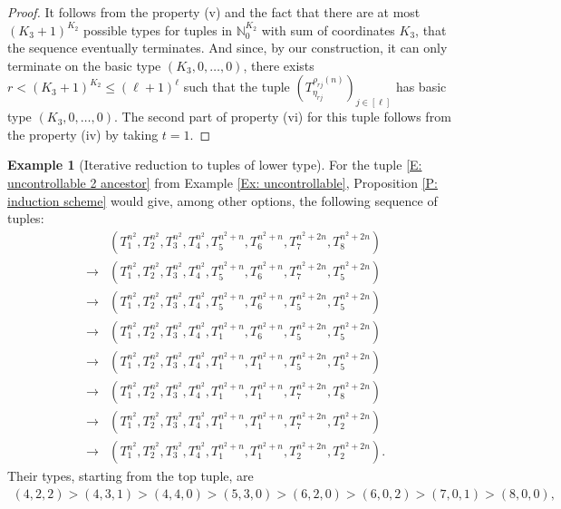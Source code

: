 \documentclass[11pt]{amsart}
\theoremstyle{definition}
\newtheorem{example}{Example}
\newcommand{\N}{{\mathbb N}}
\newcommand{\brac}[1]{\mathopen{}\left( #1 \mathclose{}\right)}
\begin{document}
\begin{proof}
It follows from the property (v) and the fact that there are at most $(K_3+1)^{K_2}$ possible types for tuples in $\N_0^{K_2}$ with sum of coordinates  $K_3$, that the sequence eventually terminates. And since, by our construction, it can only terminate on the basic type
	$(K_3,0,\ldots, 0)$,
there exists $r<(K_3+1)^{K_2}\leq (\ell+1)^\ell$ such that the tuple $\brac{T_{\eta_{rj}}^{\rho_{rj}(n)}}_{j\in[\ell]}$ has basic type $(K_3,0,\ldots, 0)$. The second part of property (vi) for this tuple follows from the property (iv) by taking $t=1$.
\end{proof}

\begin{example}[Iterative reduction to tuples of lower type]\label{Ex: induction scheme ex}
For the tuple \eqref{E: uncontrollable 2 ancestor} from Example \ref{Ex: uncontrollable}, Proposition \ref{P: induction scheme} would give, among other options, the following sequence of tuples:
\begin{align*}
        &\brac{T_1^{n^2}, T_2^{n^2}, T_3^{n^2}, T_4^{n^2}, T_5^{n^2+n}, T_6^{n^2+n}, T_7^{n^2+2n}, T_8^{n^2+2n}}\\
        \rightarrow & \brac{T_1^{n^2}, T_2^{n^2}, T_3^{n^2}, T_4^{n^2}, T_5^{n^2+n}, T_6^{n^2+n}, T_7^{n^2+2n}, T_5^{n^2+2n}}\\
        \rightarrow & \brac{T_1^{n^2}, T_2^{n^2}, T_3^{n^2}, T_4^{n^2}, T_5^{n^2+n}, T_6^{n^2+n}, T_5^{n^2+2n}, T_5^{n^2+2n}}\\
        \rightarrow & \brac{T_1^{n^2}, T_2^{n^2}, T_3^{n^2}, T_4^{n^2}, T_1^{n^2+n}, T_6^{n^2+n}, T_5^{n^2+2n}, T_5^{n^2+2n}}\\
        \rightarrow & \brac{T_1^{n^2}, T_2^{n^2}, T_3^{n^2}, T_4^{n^2}, T_1^{n^2+n}, T_1^{n^2+n}, T_5^{n^2+2n}, T_5^{n^2+2n}}\\
        \rightarrow & \brac{T_1^{n^2}, T_2^{n^2}, T_3^{n^2}, T_4^{n^2}, T_1^{n^2+n}, T_1^{n^2+n}, T_7^{n^2+2n}, T_8^{n^2+2n}}\\
        \rightarrow & \brac{T_1^{n^2}, T_2^{n^2}, T_3^{n^2}, T_4^{n^2}, T_1^{n^2+n}, T_1^{n^2+n}, T_7^{n^2+2n}, T_2^{n^2+2n}}\\
        \rightarrow & \brac{T_1^{n^2}, T_2^{n^2}, T_3^{n^2}, T_4^{n^2}, T_1^{n^2+n}, T_1^{n^2+n}, T_2^{n^2+2n}, T_2^{n^2+2n}}.
\end{align*}
Their types, starting from the top tuple, are
\begin{align*}
    (4, 2, 2) > (4, 3, 1) > (4, 4, 0) > (5, 3, 0) > (6, 2, 0) > (6, 0, 2) > (7, 0, 1) > (8, 0, 0),

\end{align*}
\end{example}
\end{document}
